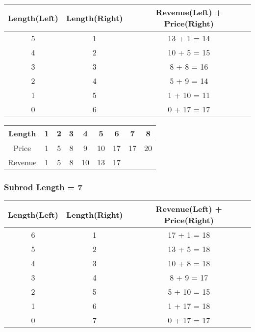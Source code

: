 \begin{table}[H]
	\centering
	\begin{tabular}{| c | c | c |}
		\hline
		Length(Left)	&	Length(Right)	&	Revenue(Left) + Price(Right)\\
		\hline
		5
		&	1
		&	13 + 1 = 14\\
		\hline
		4	
		&	2
		&	10 + 5 = 15\\
		\hline
		3
		&	3
		&	8 + 8 = 16\\
		\hline
		2
		&	4
		&	5 + 9 = 14\\
		\hline
		1
		&	5
		&	1 + 10 = 11\\
		\hline
		0
		&	6
		&	0 + 17 = 17\\
		\hline
	\end{tabular}	
\end{table}

\begin{table}[H]
	\centering
	\begin{tabular}{| c | c | c | c | c | c | c | c | c |}
		\hline
		Length
		&	1
		&	2
		&	3
		&	4
		&	5
		&	6
		&	7
		&	8\\
		\hline
		Price
		&	1
		&	5
		&	8
		&	9
		&	10
		&	17
		&	17
		&	20\\
		\hline
		Revenue
		&	1
		&	5
		&	8
		&	10
		&	13
		&	17
		&	
		&	\\
		\hline
	\end{tabular}
\end{table}

\subsubsection*{Subrod Length = 7}

\begin{table}[H]
	\centering
	\begin{tabular}{| c | c | c |}
		\hline
		Length(Left)	&	Length(Right)	&	Revenue(Left) + Price(Right)\\
		\hline
		6
		&	1
		&	17 + 1 = 18\\
		\hline
		5
		&	2
		&	13 + 5 = 18\\
		\hline
		4
		&	3
		&	10 + 8 = 18\\
		\hline
		3
		&	4
		&	8 + 9 = 17\\
		\hline
		2
		&	5
		&	5 + 10 = 15\\
		\hline
		1
		&	6
		&	1 + 17 = 18\\
		\hline
		0
		&	7
		&	0 + 17 = 17\\
		\hline
	\end{tabular}	
\end{table}

